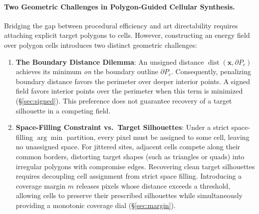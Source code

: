 \documentclass[sigconf,nonacm]{acmart}
\begin{document}
\paragraph{Two Geometric Challenges in Polygon-Guided Cellular Synthesis.}
Bridging the gap between procedural efficiency and art directability requires
attaching explicit target polygons to cells. However, constructing an energy
field over polygon cells introduces two distinct geometric challenges:
\begin{enumerate}
\item \textbf{The Boundary Distance Dilemma}: An unsigned distance
$\operatorname{dist}(\mathbf{x},\partial P_c)$ achieves its minimum \emph{on}
the boundary outline $\partial P_c$. Consequently, penalizing boundary distance
favors the perimeter over deeper interior points. A signed field favors interior points over the perimeter
when this term is minimized (\S\ref{sec:signed}). This preference does not
guarantee recovery of a target silhouette in a competing field.
\item \textbf{Space-Filling Constraint vs.\ Target Silhouettes}: Under a strict
space-filling $\arg\min$ partition, every pixel must be assigned to some cell,
leaving no unassigned space. For jittered sites, adjacent cells compete along
their common borders, distorting target shapes (such as triangles or quads)
into irregular polygons with compromise edges. Recovering clean target
silhouettes requires decoupling cell assignment from strict space filling.
Introducing a coverage margin $m$ releases pixels whose distance exceeds a
threshold, allowing cells to preserve their prescribed silhouettes while
simultaneously providing a monotonic coverage dial (\S\ref{sec:margin}).
\end{enumerate}
\end{document}
